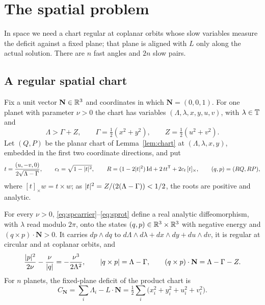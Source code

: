 \section{The spatial problem}\label{sec:spatial}

In space we need a chart regular at coplanar orbits whose slow variables measure the deficit against a fixed
plane; that plane is aligned with $L$ only along the actual solution. There are $n$ fast angles and $2n$ slow pairs.

\subsection{A regular spatial chart}

Fix a unit vector $\mathbf N\in\mathbb{R}^3$ and coordinates in which $\mathbf N=(0,0,1)$. For one planet with parameter
$\nu>0$ the chart has variables $(\Lambda,\lambda,x,y,u,v)$, with $\lambda\in\mathbb{T}$ and
\begin{equation}\label{eq:spcarrier}
  \Lambda>\Gamma+Z,\qquad \Gamma=\tfrac12(x^2+y^2),\qquad Z=\tfrac12(u^2+v^2).
\end{equation}
Let $(Q,P)$ be the planar chart of Lemma~\ref{lem:chart} at $(\Lambda,\lambda,x,y)$, embedded in the first two
coordinate directions, and put
\begin{equation}\label{eq:sprot}
  t=\frac{(u,-v,0)}{2\sqrt{\Lambda-\Gamma}},\qquad c_t=\sqrt{1-\lvert t\rvert^2},\qquad
  R=(1-2\lvert t\rvert^2)\,\mathrm{Id}+2\,tt^{\mathsf T}+2c_t\,[t]_\times,\qquad (q,p)=(RQ,RP),
\end{equation}
where $[t]_\times w=t\times w$; as $\lvert t\rvert^2=Z/(2(\Lambda-\Gamma))<1/2$, the roots are positive and analytic.

\begin{lemma}\label{lem:spchart}
For every $\nu>0$, \eqref{eq:spcarrier}--\eqref{eq:sprot} define a real analytic diffeomorphism, with $\lambda$
read modulo $2\pi$, onto the states $(q,p)\in\mathbb{R}^3\times\mathbb{R}^3$ with negative energy and $(q\times p)\cdot\mathbf N>0$.
It carries $dp\wedge dq$ to $d\Lambda\wedge d\lambda+dx\wedge dy+du\wedge dv$, it is regular at circular and at
coplanar orbits, and
\begin{equation}\label{eq:spelements}
  \frac{\lvert p\rvert^2}{2\nu}-\frac{\nu}{\lvert q\rvert}=-\frac{\nu^3}{2\Lambda^2},\qquad
  \lvert q\times p\rvert=\Lambda-\Gamma,\qquad (q\times p)\cdot\mathbf N=\Lambda-\Gamma-Z.
\end{equation}
For $n$ planets, the fixed-plane deficit of the product chart is
\begin{equation}\label{eq:fixeddeficit}
  C_{\mathbf N}=\sum_i\Lambda_i-L\cdot\mathbf N=\tfrac12\sum_i\bigl(x_i^2+y_i^2+u_i^2+v_i^2\bigr).
\end{equation}
\end{lemma}

